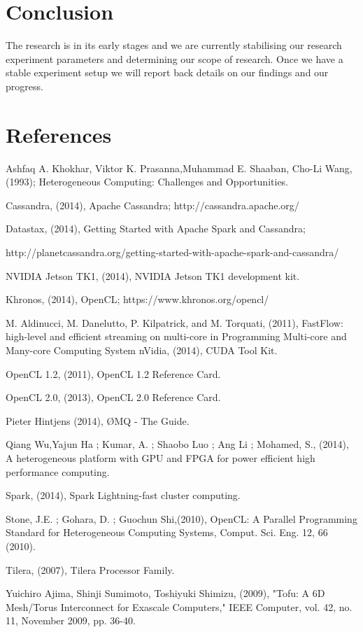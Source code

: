 \documentclass{acm_proc_article-sp}
\begin{document}
\section{Conclusion}
The research is in its early stages and we are currently stabilising our research experiment parameters and determining our scope of research. Once we have a stable experiment setup we will report back details on our findings and our progress.
\section{References}
\begin{small}
Ashfaq A. Khokhar, Viktor K. Prasanna,Muhammad E. Shaaban, Cho-Li Wang, (1993); Heterogeneous Computing: Challenges and Opportunities.

Cassandra, (2014), Apache Cassandra; http://cassandra.apache.org/ 

Datastax, (2014), Getting Started with Apache Spark and Cassandra; 

http://planetcassandra.org/getting-started-with-apache-spark-and-cassandra/ 

NVIDIA Jetson TK1, (2014), NVIDIA Jetson TK1 development kit.

Khronos, (2014), OpenCL; https://www.khronos.org/opencl/

M. Aldinucci, M. Danelutto, P. Kilpatrick, and M. Torquati, (2011), 
FastFlow: high-level and efficient streaming on multi-core in Programming Multi-core and Many-core Computing System
nVidia, (2014), CUDA Tool Kit.

OpenCL 1.2, (2011), OpenCL 1.2 Reference Card.

OpenCL 2.0, (2013), OpenCL 2.0 Reference Card.

Pieter Hintjens (2014), ØMQ - The Guide.

Qiang Wu,Yajun Ha ; Kumar, A. ; Shaobo Luo ; Ang Li ; Mohamed, S., (2014), A heterogeneous platform with GPU and FPGA for power efficient high performance computing.

Spark, (2014), Spark Lightning-fast cluster computing.

Stone, J.E. ; Gohara, D. ; Guochun Shi,(2010), OpenCL: A Parallel Programming Standard for Heterogeneous Computing Systems, Comput. Sci. Eng. 12, 66 (2010).

Tilera, (2007), Tilera Processor Family.

Yuichiro Ajima, Shinji Sumimoto, Toshiyuki Shimizu, (2009), "Tofu: A 6D Mesh/Torus Interconnect for Exascale Computers," IEEE Computer, vol. 42, no. 11, November 2009, pp. 36-40.
\end{small}
\end{document}
